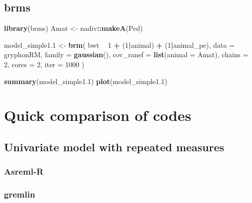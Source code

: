 \documentclass[12pt,]{book}
\newenvironment{Shaded}{\begin{snugshade}}{\end{snugshade}}
\newcommand{\DataTypeTok}[1]{\textcolor[rgb]{0.13,0.29,0.53}{#1}}
\newcommand{\DecValTok}[1]{\textcolor[rgb]{0.00,0.00,0.81}{#1}}
\newcommand{\FloatTok}[1]{\textcolor[rgb]{0.00,0.00,0.81}{#1}}
\newcommand{\KeywordTok}[1]{\textcolor[rgb]{0.13,0.29,0.53}{\textbf{#1}}}
\newcommand{\NormalTok}[1]{#1}
\newcommand{\OperatorTok}[1]{\textcolor[rgb]{0.81,0.36,0.00}{\textbf{#1}}}
\newcommand{\StringTok}[1]{\textcolor[rgb]{0.31,0.60,0.02}{#1}}
\begin{document}
\hypertarget{brms-3}{%
\section{brms}\label{brms-3}}

\begin{Shaded}
\begin{Highlighting}[]
\KeywordTok{library}\NormalTok{(brms)}
\NormalTok{Amat <-}\StringTok{ }\NormalTok{nadiv}\OperatorTok{::}\KeywordTok{makeA}\NormalTok{(Ped)}

\NormalTok{model_simple1}\FloatTok{.1}\NormalTok{ <-}\StringTok{ }\KeywordTok{brm}\NormalTok{(}
\NormalTok{  bwt }\OperatorTok{~}\StringTok{ }\DecValTok{1} \OperatorTok{+}\StringTok{ }\NormalTok{(}\DecValTok{1}\OperatorTok{|}\NormalTok{animal) }\OperatorTok{+}\StringTok{ }\NormalTok{(}\DecValTok{1}\OperatorTok{|}\NormalTok{animal_pe), }\DataTypeTok{data =}\NormalTok{ gryphonRM,}
  \DataTypeTok{family =} \KeywordTok{gaussian}\NormalTok{(), }\DataTypeTok{cov_ranef =} \KeywordTok{list}\NormalTok{(}\DataTypeTok{animal =}\NormalTok{ Amat),}
  \DataTypeTok{chains =} \DecValTok{2}\NormalTok{, }\DataTypeTok{cores =} \DecValTok{2}\NormalTok{, }\DataTypeTok{iter =} \DecValTok{1000}
\NormalTok{)}

\KeywordTok{summary}\NormalTok{(model_simple1}\FloatTok{.1}\NormalTok{)}
\KeywordTok{plot}\NormalTok{(model_simple1}\FloatTok{.1}\NormalTok{)}
\end{Highlighting}
\end{Shaded}

\hypertarget{quick-comparison-of-codes}{%
\chapter{Quick comparison of codes}\label{quick-comparison-of-codes}}

\hypertarget{univariate-model-with-repeated-measures}{%
\section{Univariate model with repeated measures}\label{univariate-model-with-repeated-measures}}

\hypertarget{asreml-r-3}{%
\subsection{Asreml-R}\label{asreml-r-3}}

\hypertarget{gremlin-4}{%
\subsection{gremlin}\label{gremlin-4}}
\end{document}
